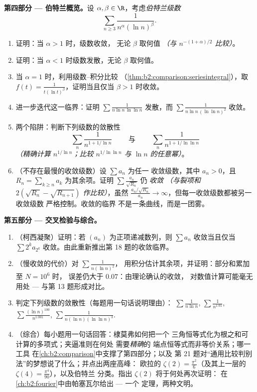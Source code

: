 \begin{problem}[{周末问题 --- $\zeta(2) = \pi^2/6$ 与
伯特兰全景}]
\medskip
\noindent\textbf{第四部分 --- 伯特兰概览。}设 $\alpha,
\beta \in \R$，考虑\emph{伯特兰级数}
\[
\sum_{n \geq 3} \frac{1}{n^{\alpha}(\ln n)^{\beta}} .
\]
\begin{enumerate}[resume]
  \item 证明：当 $\alpha > 1$ 时，级数收敛，
        无论 $\beta$ 取何值 \emph{（与
        $n^{-(1+\alpha)/2}$ 比较）}。
  \item 证明：当 $\alpha < 1$ 时级数发散，无论
        $\beta$ 取何值。
  \item 当 $\alpha = 1$ 时，利用级数--积分比较
        （\cref{thm:b2:comparison:seriesintegral}），取 $f(t) =
        \frac{1}{t(\ln t)^\beta}$，证明当且仅当 $\beta
        > 1$ 时收敛。
  \item 进一步迭代这一临界：证明 $\sum\frac{1}{n\ln n\,\ln\ln
        n}$ 发散，而 $\sum\frac{1}{n\ln n\,(\ln\ln n)^2}$
        收敛。
  \item 两个陷阱：判断下列级数的敛散性
        \[
        \sum_n \frac{1}{n^{1 + 1/\ln n}}
        \qquad\text{ 与 }\qquad
        \sum_n \frac{1}{n^{1 + 1/\ln\ln n}}
        \]
        \emph{（精确计算 $n^{1/\ln n}$；比较
        $n^{1/\ln\ln n}$ 与 $\ln n$ 的任意幂）}。
  \item （不存在最慢的收敛级数）设 $\sum a_n$ 为任一
        收敛级数，其中 $a_n > 0$，且 $R_n = \sum_{k
        \geq n}a_k$ 为其余项。证明 $\sum
        \frac{a_n}{\sqrt{R_n}}$ 仍 \emph{收敛}
        \emph{（与裂项和 $2(\sqrt{R_n} -
        \sqrt{R_{n+1}})$ 作比较）}，虽然 $\frac{a_n/\sqrt{R_n}}{a_n}
        \to \infty$，但每一收敛级数都被另一收敛级数
        严格控制。收敛的临界
        不是一条曲线，而是一团雾。
\end{enumerate}

\medskip
\noindent\textbf{第五部分 --- 交叉检验与综合。}
\begin{enumerate}[resume]
  \item （柯西凝聚）证明：若 $(a_n)$ 为正项递减数列，则
        $\sum a_n$ 收敛当且仅当 $\sum 2^k a_{2^k}$
        收敛。由此重新推出第 18 题的收敛临界。
  \item （慢收敛的代价）对 $\sum\frac1{n(\ln n)^2}$，
        用积分估计其余项，并证明：部分和累加至 $N = 10^6$ 时，
        误差仍大于 $0.07$：由理论确认的收敛，
        对数值计算可能毫无用处
        --- 与第 13 题形成对比。
  \item 判定下列级数的敛散性（每题用一句话说明理由）：
        $\sum\frac1{n\ln n}$, $\sum\frac1{n^{1.01}}$,
        $\sum\frac{(\ln n)^{100}}{n^{1.001}}$,
        $\sum\frac1{n(\ln n)(\ln\ln n)^{3}}$.
  \item （综合）每小题用一句话回答：棣莫弗如何把一个
        三角恒等式化为根之和可计算的多项式；夹逼准则在何处
        需要\emph{精确}的
        端点恒等式而非等价关系；哪一工具
        在\cref{ch:b2:comparison}中支撑了第四部分；以及
        第 21 题对“通用比较判别法”的梦想说了什么；并点出两座高峰：
        欧拉的
        $\zeta(2) = \frac{\pi^2}6$（及其上一层的
        $\zeta(4) = \frac{\pi^4}{90}$），以及伯特兰
        分类。指出 $\zeta(2)$ 将于何处再次证明：
        在\cref{ch:b2:fourier}中由帕塞瓦尔给出 --- 一个
        定理，两种文明。
\end{enumerate}
\end{problem}
